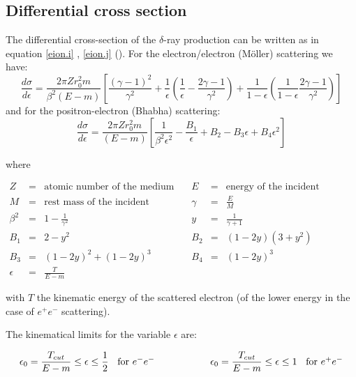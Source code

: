 \subsection{Differential cross section}

The differential cross-section of the $\delta$-ray production can
be written as in equation \ref{eion.i} , \ref{eion.j}
 (\cite{eion.messel}). For the
electron/electron (M\"{o}ller) scattering we have:
\begin{equation}
\label{eion.i}
\frac{d\sigma }{d \epsilon }=\frac{2 \pi Z r^2 _0 m }{\beta^2 (E-m)}
\left[ \frac{(\gamma -1 )^2}  {\gamma^2 }+\frac{1}{\epsilon}
\left(\frac{1}{\epsilon}-\frac{2 \gamma -1 } {\gamma^2 } \right) +
\frac{1}{1- \epsilon}\left(\frac{1} {1- \epsilon} \frac{2 \gamma - 1}
{\gamma^2 }\right)  \right]
\end{equation}
and for the positron-electron (Bhabha) scattering:
\begin{equation}
\label{eion.j}
\frac{d \sigma}{d \epsilon}=\frac{2 \pi Z r^2_0 m }{(E-m)}\left[
\frac{1} {\beta^2 \epsilon^2}-\frac{B_1}{\epsilon}+B_2 - B_3 \epsilon
+ B_4 \epsilon^2\right]
 \end{equation}

where

\[
\begin{array}{lcllcl}
Z        & = & \mbox{atomic number of the medium}   &
E        & = & \mbox{energy of the incident particle} \\
M        & = & \mbox{rest mass of the incident particle} &
\gamma   & = & \frac{E}{M}   \\ [.2cm]
\beta^2  & = & 1- \frac{1} {\gamma^2 } &
 y       & = & \frac{1} {\gamma + 1}               \\ [.2cm]
 B_1     & = & 2-y^2                   &
 B_2     & = & (1-2y)(3+y^2 )                       \\
 B_3     & = & (1-2y)^2+(1-2y)^3 &
 B_4     & = & (1-2y)^3  \\
\epsilon & = & \frac{T} {E-m}
\end{array}
\]

with $T$ the kinematic energy of the scattered electron (of the lower
energy in the case of $e^+ e^-$ scattering).

The kinematical limits for the variable $\epsilon$ are:

\[
\epsilon_0 = \frac{T_{cut}}{E-m} \leq \epsilon \leq \frac{1}{2}
\mbox{\hspace{.2cm} for $e^- e^-$} \hspace{2cm}
\epsilon_0 = \frac{T_{cut}}{E-m} \leq \epsilon \leq 1
\mbox{\hspace{.2cm} for $e^+ e^-$}
\]

